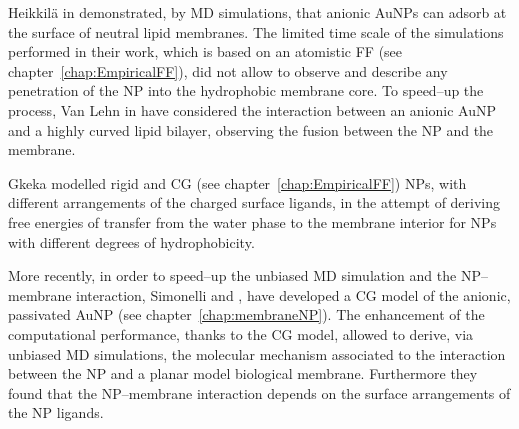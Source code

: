 Heikkilä \etal{} in \cite{Heikkila2014} demonstrated, by \ac{MD} simulations, that anionic \acp{AuNP} can adsorb 
at the surface of neutral lipid membranes. The limited time scale of the simulations performed in their work, 
which is based on an atomistic \ac{FF} (see chapter~\ref{chap:EmpiricalFF}), did not allow to observe and describe 
any penetration of the \ac{NP} into the hydrophobic membrane core. To speed--up the process, Van Lehn \etal{} in 
\cite{VanLehn2014} have considered the interaction between an anionic \ac{AuNP} and a highly curved lipid bilayer, 
observing the fusion between the \ac{NP} and the membrane.

Gkeka \etal{} modelled rigid \cite{Gkeka2013} and \ac{CG} \cite{Gkeka2014} (see chapter~\ref{chap:EmpiricalFF}) 
\acp{NP}, with different arrangements of the charged surface ligands, in the attempt of deriving free energies of 
transfer from the water phase to the membrane interior for \acp{NP} with different degrees of hydrophobicity.

More recently, in order to speed--up the unbiased \ac{MD} simulation and the \ac{NP}--membrane interaction, 
Simonelli \etal{} \cite{simonelliThesis} and \cite{ourPaper}, have developed a \ac{CG} model of the anionic, 
passivated \ac{AuNP} (see chapter~\ref{chap:membraneNP}). The enhancement of the computational performance, thanks 
to the \ac{CG} model, allowed to derive, via unbiased \ac{MD} simulations, the molecular mechanism associated to 
the interaction between the \ac{NP} and a planar model biological membrane. Furthermore they found that the 
\ac{NP}--membrane interaction depends on the surface arrangements of the \ac{NP} ligands.

